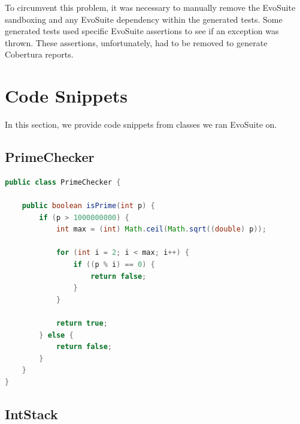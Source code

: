 To circumvent this problem, it was necessary to manually remove the EvoSuite sandboxing and any EvoSuite dependency within the generated tests. 
Some generated tests used specific EvoSuite assertions to see if an exception was thrown. 
These assertions, unfortunately, had to be removed to generate Cobertura reports. 

\section{Code Snippets}

In this section, we provide code snippets from classes we ran EvoSuite on.

\subsection{PrimeChecker}

\begin{lstlisting}[language=Java, caption=PrimeChecker]
public class PrimeChecker {

    public boolean isPrime(int p) {
        if (p > 1000000000) {
            int max = (int) Math.ceil(Math.sqrt((double) p));

            for (int i = 2; i < max; i++) {
                if ((p % i) == 0) {
                    return false;
                }
            }

            return true;
        } else {
            return false;
        }
    }
}
\end{lstlisting}

\subsection{IntStack}

